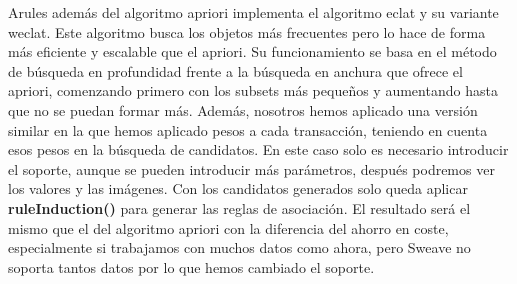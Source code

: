 \documentclass [a4paper] {article}
\begin{document}
Arules además del algoritmo apriori implementa el algoritmo eclat y su variante weclat. Este algoritmo busca los objetos más frecuentes pero lo hace de forma más eficiente y escalable que el apriori.
Su funcionamiento se basa en el método de búsqueda en profundidad frente a la búsqueda en anchura que ofrece el apriori, comenzando primero con los subsets más pequeños y aumentando hasta que no se puedan formar más.
Además, nosotros hemos aplicado una versión similar en la que hemos aplicado pesos a cada transacción, teniendo en cuenta esos pesos en la búsqueda de candidatos. En este caso solo es necesario introducir el soporte, aunque
se pueden introducir más parámetros, después podremos ver los valores y las imágenes. Con los candidatos generados solo queda aplicar \textbf{ruleInduction()} para generar las reglas de asociación. El resultado será el mismo que 
el del algoritmo apriori con la diferencia del ahorro en coste, especialmente si trabajamos con muchos datos como ahora, pero Sweave no soporta tantos datos por lo que hemos cambiado el soporte.
\end{document}

